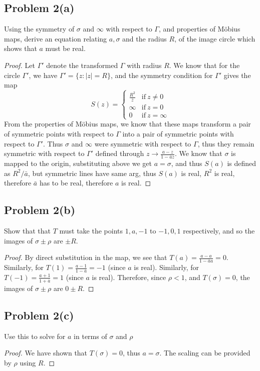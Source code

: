\documentclass{article}[12pt]
\begin{document}
\subsection*{Problem 2(a)}Using the symmetry of $\sigma$
and $\infty$ with respect to $\Gamma$, and properties of M\"obius
maps, derive an equation relating $a,\sigma$ and the radius $R$,
of the image circle which shows that $a$ must be real.
\begin{proof}
Let $\Gamma'$ denote the transformed $\Gamma$ with radius $R$.
We know that for the circle $\Gamma'$, we have $\Gamma'=\{z:|z|=R\}$,
and the symmetry condition for $\Gamma'$ gives the map
\[
S(z) = \left\{ \begin{array}{cc}
                \frac{R^2}{\overline{z}} & \mbox{if}\ z\ne 0 \\
                \infty & \mbox{if}\ z=0 \\
                0 & \mbox{if}\ z=\infty \end{array}\right.
\]
From the properties of M\"obius maps, we know that these maps
transform a pair of symmetric points with respect to $\Gamma$ into
a pair of symmetric points with respect to $\Gamma'$. Thus $\sigma$
and $\infty$ were symmetric with respect to $\Gamma$, thus they
remain symmetric with respect to $\Gamma'$ defined through
$z\to \frac{a-z}{1-\overline{a}z}$. We know that $\sigma$ is mapped
to the origin, substituting above we get $a=\sigma$, and thus $S(a)$
is defined as $R^2/\bar{a}$, but symmetric lines have same arg, thus
$S(a)$ is real, $R^2$ is real, therefore $\bar{a}$ has to be real,
therefore $a$ is real.
\end{proof}

\subsection*{Problem 2(b)}Show that that $T$ must take the points
$1,a,-1$ to $-1,0,1$ respectively, and so the images of
$\sigma \pm \rho$ are $\pm R$.
\begin{proof}
By direct substitution in the map, we see that $T(a)=\frac{a-a}{1-\bar{a}a}=0$.
Similarly, for $T(1)=\frac{a-1}{1-\bar{a}}=-1$ (since $a$ is real).
Similarly, for $T(-1)=\frac{a+1}{1+\bar{a}}=1$ (since $a$ is real).
Therefore, since $\rho<1$, and $T(\sigma)=0$, the images of
$\sigma\pm\rho$ are $0\pm R$.
\end{proof}

\subsection*{Problem 2(c)}Use this to solve for $a$ in terms of
$\sigma$ and $\rho$
\begin{proof}
We have shown that $T(\sigma)=0$, thus $a=\sigma$. The scaling
can be provided by $\rho$ using $R$.
\end{proof}
\end{document}
